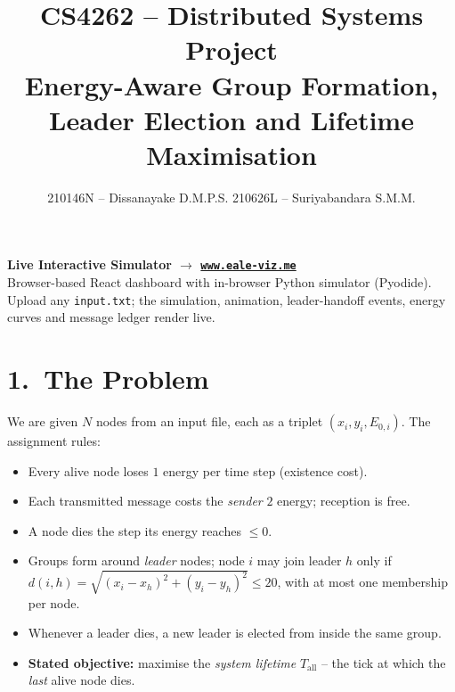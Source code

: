 \documentclass[a4paper,10pt]{article}
\title{\vspace{-2.4em}\textbf{CS4262 -- Distributed Systems Project}\\[2pt]
\large Energy-Aware Group Formation, Leader Election and Lifetime Maximisation}
\author{210146N -- Dissanayake D.M.P.S.\quad\textbar\quad
        210626L -- Suriyabandara S.M.M.}
\date{\vspace{-2.4em}}
\begin{document}
\maketitle

\vspace{-1.4em}
\begin{center}
\begin{tcolorbox}[colback=blue!5,colframe=blue!55!black,boxrule=0.5pt,arc=2pt,
 left=4pt,right=4pt,top=2pt,bottom=2pt,width=0.96\linewidth]
\centering
\textbf{\large Live Interactive Simulator $\rightarrow$ \href{https://www.eale-viz.me}{\texttt{www.eale-viz.me}}}\\[1pt]
\small Browser-based React dashboard with in-browser Python simulator (Pyodide). Upload any \texttt{input.txt}; the simulation, animation, leader-handoff events, energy curves and message ledger render live.
\end{tcolorbox}
\end{center}

\vspace{-0.6em}
\section*{1.\ The Problem}
\vspace{-0.4em}
We are given $N$ nodes from an input file, each as a triplet $(x_i,y_i,E_{0,i})$.
The assignment rules:
\begin{itemize}
\item Every alive node loses $1$ energy per time step (existence cost).
\item Each transmitted message costs the \emph{sender} $2$ energy; reception is free.
\item A node dies the step its energy reaches $\le 0$.
\item Groups form around \emph{leader} nodes; node $i$ may join leader $h$ only if
$d(i,h)=\sqrt{(x_i-x_h)^2+(y_i-y_h)^2}\le 20$, with at most one membership per node.
\item Whenever a leader dies, a new leader is elected from inside the same group.
\item \textbf{Stated objective:} maximise the \emph{system lifetime} $T_{\text{all}}$ -- the tick at which the \emph{last} alive node dies.
\end{itemize}

\vspace{-0.4em}
\end{document}
